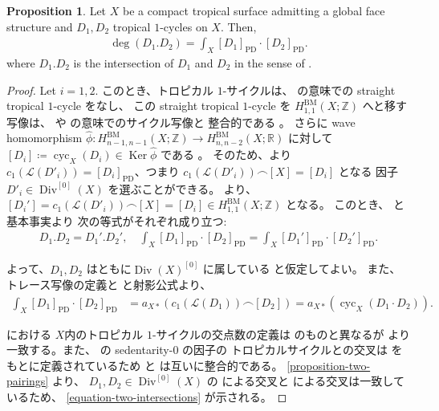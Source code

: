 \documentclass[a4paper,dvipdfmx,reqno,12pt]{amsart}
\theoremstyle{definition}
\newtheorem{proposition}[theorem]{Proposition}
\newcommand{\deq}{\coloneqq}
\newcommand{\opn}[1]{\operatorname{#1}}
\newcommand{\PD}[1]{[#1]_{\mathrm{PD}}}
\numberwithin{equation}{section}
\begin{document}
\begin{proposition}
\label{proposition-cycle-chern}
Let $X$ be a compact tropical surface admitting a global face
structure and $D_1,D_2$
tropical $1$-cycles on $X$. Then,
\begin{align}
\label{equation-two-intersections}
\opn{deg}(D_1 .  D_2)=\int_X \PD{D_1}\cdot \PD{D_2}.
\end{align}
where $D_1. D_2$ is the intersection of $D_1$ and $D_2$
in the sense of \cite{shaw2015tropical}.
\end{proposition}
\begin{proof}
Let $i=1,2$.
このとき、トロピカル $1$-サイクルは、
\cite[Definition 4.2]{MR3330789} の意味での
straight tropical $1$-cycle をなし、
この straight tropical $1$-cycle を
$H_{1,1}^{\mathrm{BM}}(X;\mathbb{Z})$
へと移す写像は、\cite{MR3894860} や
\cite{MR4637248} の意味でのサイクル写像と
整合的である \cite[Theorem 5.13]{MR4637248}。
さらに wave homomorphism 
$\hat{\phi} \colon
H_{n-1,n-1}^{\mathrm{BM}}(X;\mathbb{Z})
\to H_{n,n-2}^{\mathrm{BM}}(X;\mathbb{R})$
に対して
$[D_i]\deq \opn{cyc}_X(D_i)\in \opn{Ker} \hat{\phi}$
である \cite[Theorem 5.4]{MR3330789}。
そのため、\cite[Lemma 5.13]{MR3894860}より
$c_1(\mathcal{L}(D'_i))=\PD{D_i}$、つまり
$c_1(\mathcal{L}(D'_i))\frown [X]=[D_i]$ となる
因子 $D'_i\in \opn{Div}^{[0]}(X)$ を選ぶことができる。
\cite[Proposition 5.12]{MR4637248}より、
$[D_i']=c_1(\mathcal{L}(D'_i))\frown [X]=[D_i]\in 
H_{1,1}^{\mathrm{BM}}(X;\mathbb{Z})$ 
となる。
このとき、
\cite[Proposition 3.34]{shaw2015tropical} と基本事実より
次の等式がそれぞれ成り立つ:
\begin{align}
D_1.D_2=D_1'.D_2', \quad 
\int_X \PD{D_1}\cdot \PD{D_2}
=\int_X \PD{D_1'}\cdot \PD{D_2'}.
\end{align}

よって、$D_1,D_2$ はともに$\opn{Div}(X)^{[0]}$ に属している
と仮定してよい。
また、トレース写像の定義と
\cite[Proposition 5.12]{MR4637248}と射影公式より、
\begin{align}
\int_X \PD{D_1}\cdot \PD{D_2}
&=a_{X*}(c_1(\mathcal{L}(D_1))\frown [D_2])
=a_{X*}(\opn{cyc}_X(D_1\cdot D_2)).
\end{align}

\cite{shaw2015tropical} における
$X$内のトロピカル
$1$-サイクルの交点数の定義は
\cite{shaw2011tropical} のものと異なるが
\cite[Theorem 3.1.7]{shaw2011tropical}
より一致する。また、
\cite[]{demedrano2023chern}
の sedentarity-$0$ の因子の
トロピカルサイクルとの交叉は \cite{shaw2011tropical}
をもとに定義されているため
\cite{demedrano2023chern} と
\cite{shaw2015tropical} は互いに整合的である。
\cref{proposition-two-pairings} より、
$D_1,D_2\in \opn{Div}^{[0]}(X)$ の
\cite{demedrano2023chern} による交叉と
\cite{MR4637248} による交叉は一致しているため、
\cref{equation-two-intersections} が示される。
\end{proof}




\end{document}
